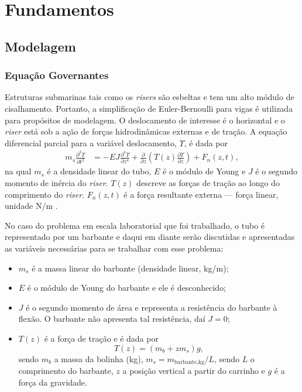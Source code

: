 \chapter{Fundamentos\label{chap:FundamentacaoMatematica}}


\section{Modelagem\label{modelagem}}
\subsection{Equação Governantes}

Estruturas submarinas tais como os \textit{risers} são esbeltas e tem um alto módulo de cisalhamento. Portanto, a simplificação de Euler-Bernoulli para vigas é utilizada para propósitos de modelagem. O deslocamento de interesse é o horizontal e o \textit{riser} está sob a ação de forças hidrodinâmicas externas e de tração. A equação diferencial parcial para a variável deslocamento, $\Upsilon$, é dada por \begin{align}
	m_s \frac{\partial^2 \Upsilon}{\partial t^2} &= -E J	\frac{\partial^4 \Upsilon}{\partial z^4} + \frac{\partial}{\partial z}\left(T(z) \frac{\partial \Upsilon}{\partial z}\right) + F_n(z,t)\label{equacaoMorison},
\end{align} na qual $m_s$ é a densidade linear do tubo, $E$ é o módulo de Young e $J$ é o segundo momento de inércia do \textit{riser}. $T(z)$ descreve as forças de tração ao longo do comprimento do \textit{riser}. $F_n(z,t)$ é a força resultante externa --- força linear, unidade N/m \cite{fabricioIFAC}. 

No caso do problema em escala laboratorial que foi trabalhado, o tubo é representado por um barbante e daqui em diante serão discutidas e apresentadas as variáveis necessárias para se trabalhar com esse problema: \begin{itemize}
	\item $m_s$ é a massa linear do barbante (densidade linear, kg/m);
	\item $E$ é o módulo de Young do barbante e ele é desconhecido;
	\item $J$ é o segundo momento de área e representa a resistência do barbante à flexão. O barbante não apresenta tal resistência, daí $J=0$;
	\item $T(z)$ é a força de tração e é dada por \[T(z) = \left(m_b+z m_s\right)g,\] sendo $m_b$ a massa da bolinha (kg), $m_s = m_{\textrm{barbante,kg}}/L$, sendo $L$ o comprimento do barbante, $z$ a posição vertical a partir do carrinho e $g$ é a força da gravidade.
\end{itemize}


